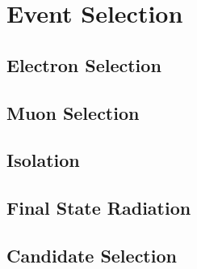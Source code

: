 \section{Event Selection}\label{sec:evt_sel}

\subsection{Electron Selection}\label{subsec:elec_sel}

\subsection{Muon Selection}\label{subsec:muon_sel}

\subsection{Isolation}\label{subsec:iso}

\subsection{Final State Radiation}\label{subsec:fsr}

\subsection{\PZ\PZ Candidate Selection}\label{subsec:zz_sel}